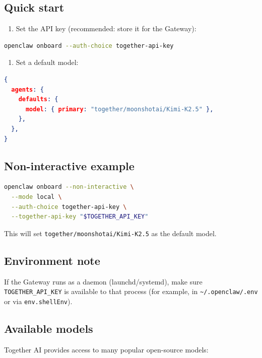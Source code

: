 \subsection{Quick start}


\begin{enumerate}
  \item Set the API key (recommended: store it for the Gateway):
\end{enumerate}


\begin{lstlisting}[language=bash]
openclaw onboard --auth-choice together-api-key
\end{lstlisting}


\begin{enumerate}
  \item Set a default model:
\end{enumerate}


\begin{lstlisting}[language=json]
{
  agents: {
    defaults: {
      model: { primary: "together/moonshotai/Kimi-K2.5" },
    },
  },
}
\end{lstlisting}


\subsection{Non-interactive example}


\begin{lstlisting}[language=bash]
openclaw onboard --non-interactive \
  --mode local \
  --auth-choice together-api-key \
  --together-api-key "$TOGETHER_API_KEY"
\end{lstlisting}


This will set \texttt{together/moonshotai/Kimi-K2.5} as the default model.

\subsection{Environment note}


If the Gateway runs as a daemon (launchd/systemd), make sure \texttt{TOGETHER\_API\_KEY}
is available to that process (for example, in \texttt{\textasciitilde{}/.openclaw/.env} or via
\texttt{env.shellEnv}).

\subsection{Available models}


Together AI provides access to many popular open-source models:

